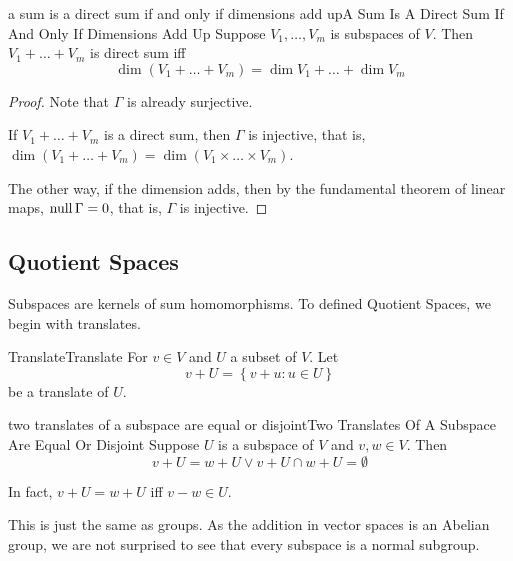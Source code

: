 \documentclass[../main.tex]{subfiles}
\begin{document}
\begin{corollary}{a sum is a direct sum if and only if dimensions add up}{A Sum Is A Direct Sum If And Only If Dimensions Add Up}
Suppose $V_1, \ldots ,V_m$ is subspaces of $V$. Then $V_1+\ldots +V_m$ is direct sum iff
\begin{equation*}
\dim (V_1+\ldots +V_m) = \dim V_1+\ldots +\dim V_m
\end{equation*}
\end{corollary}
\begin{proof}
Note that $\Gamma$ is already surjective.

If $V_1+\ldots +V_m$ is a direct sum, then $\Gamma$ is injective, that is, $\dim (V_1+\ldots +V_m) = \dim (V_1 \times \ldots \times V_m)$.

The other way, if the dimension adds, then by the fundamental theorem of linear maps, $\operatorname{null} \Gamma = 0$, that is, $\Gamma$ is injective.
\end{proof}

\subsection{Quotient Spaces}

Subspaces are kernels of sum homomorphisms. To defined Quotient Spaces, we begin with translates.
\begin{definition}{Translate}{Translate}
For $v\in V$ and $U$ a subset of $V$. Let
\begin{equation}
v+U = \left\{ v+u: u\in U \right\}
\end{equation}
be a translate of $U$.
\end{definition}

\begin{theorem}{two translates of a subspace are equal or disjoint}{Two Translates Of A Subspace Are Equal Or Disjoint}
Suppose $U$ is a subspace of $V$ and $v,w\in V$. Then
\begin{equation*}
v+U=w+U \lor v+U\cap w+U = \emptyset 
\end{equation*}

In fact, $v+U=w+U$ iff  $v-w\in U$.
\end{theorem}

This is just the same as groups. As the addition in vector spaces is an Abelian group, we are not surprised to see that every subspace is a normal subgroup.
\end{document}
